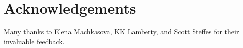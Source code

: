 \documentclass{sig-alternate}
\begin{document}

\section{Acknowledgements}

Many thanks to Elena Machkasova, KK Lamberty, and Scott Steffes for their invaluable feedback. 

\end{document}
